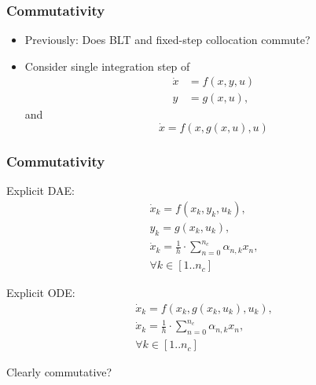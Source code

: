 \documentclass[]{beamer}
\begin{document}
\begin{frame}
\frametitle{Commutativity}
\begin{itemize}
\item
Previously: Does BLT and fixed-step collocation commute?
\item
Consider single integration step of
\begin{equation}
\begin{aligned}
\dot x &= f(x, y, u) \\
y &= g(x, u),
\end{aligned}
\end{equation}
and
\begin{equation}
\dot x = f(x, g(x, u), u)
\end{equation}
\end{itemize}
\end{frame}

\begin{frame}
\frametitle{Commutativity}
Explicit DAE:
\begin{subequations}
\begin{gather}
\dot x_k = f(x_k, y_k, u_k), \\ 
y_k = g(x_k, u_k), \\
\dot{x}_k = \frac{1}{h} \cdot \sum_{n = 0}^{n_c} \alpha_{n, k} x_n, \\
\forall k \in [1 . . n_c]
\end{gather} 
\end{subequations}

Explicit ODE:
\begin{subequations}
\begin{gather}
\dot x_k = f(x_k, g(x_k, u_k), u_k), \\ 
\dot{x}_k = \frac{1}{h} \cdot \sum_{n = 0}^{n_c} \alpha_{n, k} x_n, \\
\forall k \in [1 . . n_c]
\end{gather} 
\end{subequations}

Clearly commutative?
\end{frame}
\end{document}
